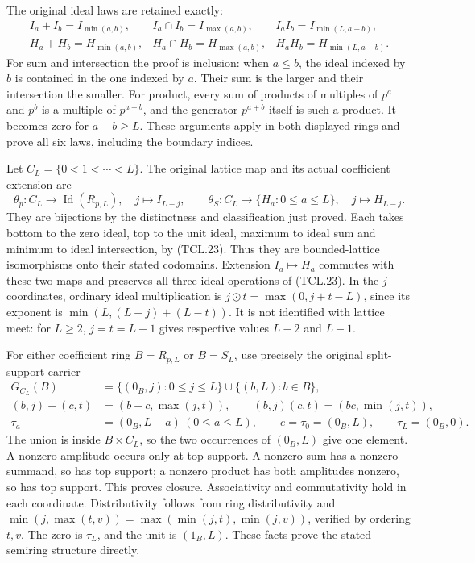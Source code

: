 The original ideal laws are retained exactly:
\[
 \begin{array}{lll}
 I_a+I_b=I_{\min(a,b)},& I_a\cap I_b=I_{\max(a,b)},&
              I_a I_b=I_{\min(L,a+b)},\\
 H_a+H_b=H_{\min(a,b)},& H_a\cap H_b=H_{\max(a,b)},&
              H_a H_b=H_{\min(L,a+b)}.
 \end{array}
 \tag{TCL.23}\label{eq:tcl-ideal-laws}
\]
For sum and intersection the proof is inclusion: when \(a\leq b\),
the ideal indexed by \(b\) is contained in the one indexed by
\(a\). Their sum is the larger and their intersection the smaller.
For product, every sum of products of multiples of \(p^a\) and
\(p^b\) is a multiple of \(p^{a+b}\), and the generator
\(p^{a+b}\) itself is such a product. It becomes zero for
\(a+b\geq L\). These arguments apply in both displayed rings
and prove all six laws, including the boundary indices.

Let \(C_L=\{0<1<\cdots<L\}\). The original lattice map and its
actual coefficient extension are
\[
 \theta_p:C_L\longrightarrow\operatorname{Id}(R_{p,L}),
       \quad j\longmapsto I_{L-j},\qquad
 \theta_S:C_L\longrightarrow\{H_a:0\leq a\leq L\},
       \quad j\longmapsto H_{L-j}.
 \tag{TCL.24}\label{eq:tcl-theta}
\]
They are bijections by the distinctness and classification just
proved. Each takes bottom to the zero ideal, top to the unit ideal,
maximum to ideal sum and minimum to ideal intersection, by
(TCL.23). Thus they are bounded-lattice isomorphisms onto their
stated codomains. Extension \(I_a\mapsto H_a\) commutes with
these two maps and preserves all three ideal operations of
(TCL.23). In the \(j\)-coordinates, ordinary ideal multiplication
is \(j\mathbin{\odot}t=\max(0,j+t-L)\), since its exponent is
\(\min(L,(L-j)+(L-t))\). It is not identified with lattice
meet: for \(L\geq2\), \(j=t=L-1\) gives respective values
\(L-2\) and \(L-1\).

For either coefficient ring \(B=R_{p,L}\) or \(B=S_L\), use
precisely the original split-support carrier
\[
 \begin{split}
 G_{C_L}(B)&=\{(0_B,j):0\leq j\leq L\}
                 \cup\{(b,L):b\in B\},\\
 (b,j)+(c,t)&=(b+c,\max(j,t)),\qquad
 (b,j)(c,t)=(bc,\min(j,t)),\\
 \tau_a&=(0_B,L-a)\ (0\leq a\leq L),\qquad
 e=\tau_0=(0_B,L),\qquad \tau_L=(0_B,0).
 \end{split}
 \tag{TCL.25}\label{eq:tcl-carrier}
\]
The union is inside \(B\times C_L\), so the two occurrences
of \((0_B,L)\) give one element. A nonzero amplitude occurs only
at top support. A nonzero sum has a nonzero summand, so has top
support; a nonzero product has both amplitudes nonzero, so has
top support. This proves closure. Associativity and commutativity
hold in each coordinate. Distributivity follows from ring
distributivity and \(\min(j,\max(t,v))
=\max(\min(j,t),\min(j,v))\), verified by ordering \(t,v\).
The zero is \(\tau_L\), and the unit is \((1_B,L)\).
These facts prove the stated semiring structure directly.

